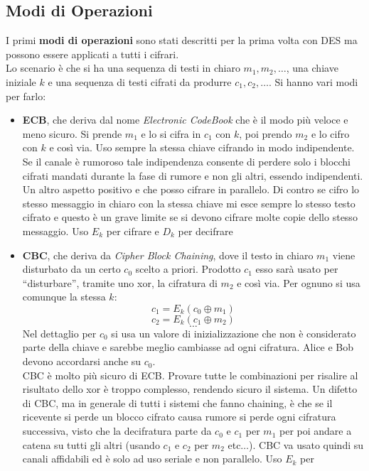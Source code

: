 \documentclass[a4paper,12pt, oneside]{book}
\begin{document}
\subsection{Modi di Operazioni}
I primi \textbf{modi di operazioni} sono stati descritti per la prima volta con
DES ma possono essere applicati a tutti i cifrari.\\
Lo scenario è che si ha una
sequenza di testi in chiaro $m_1,m_2,\ldots$, una chiave iniziale $k$ e una
sequenza di testi cifrati da produrre $c_1,c_2,\ldots$. Si hanno vari modi per
farlo:
\begin{itemize}
  \item \textbf{ECB}, che deriva dal nome \textit{Electronic CodeBook} che è il
  modo più veloce e meno sicuro. Si prende $m_1$ e lo si cifra in $c_1$ con $k$,
  poi prendo $m_2$ e lo cifro con $k$ e così via. Uso sempre la stessa chiave
  cifrando in modo indipendente. Se il canale è rumoroso tale indipendenza
  consente di perdere solo i blocchi cifrati mandati durante la fase di rumore e
  non gli altri, essendo indipendenti. Un altro aspetto positivo e che posso
  cifrare in parallelo. Di contro se cifro lo stesso messaggio in chiaro con la
  stessa chiave mi esce sempre lo stesso testo cifrato e questo è un grave
  limite se si devono cifrare molte copie dello stesso messaggio. Uso $E_k$ per
  cifrare e $D_k$ per decifrare
  \item \textbf{CBC}, che deriva da \textit{Cipher Block Chaining}, dove il
  testo in chiaro 
  $m_1$ viene disturbato da un certo $c_0$ scelto a priori. Prodotto $c_1$ esso
  sarà usato per ``disturbare'', tramite uno xor, la cifratura di $m_2$ e così
  via. Per ognuno si usa 
  comunque la stessa $k$:
  \[c_1=E_k(c_0\oplus m_1)\]
  \[c_2=E_k(c_1\oplus m_2)\]
  \[\ldots\]
  Nel dettaglio per $c_0$ si usa un valore di inizializzazione che non è
  considerato parte della chiave e sarebbe meglio cambiasse ad ogni
  cifratura. Alice e Bob devono accordarsi anche su $c_0$. \\
  CBC è molto più sicuro di ECB. Provare tutte le combinazioni per risalire al
  risultato dello xor è troppo complesso, rendendo sicuro il sistema. Un difetto
  di CBC, ma in generale di tutti i sistemi che fanno chaining, è che se il
  ricevente si perde un blocco cifrato causa rumore si perde ogni cifratura
  successiva, visto che la decifratura parte da $c_0$ e $c_1$ per $m_1$ per poi
  andare a catena su tutti gli altri (usando $c_1$ e $c_2$ per $m_2$
  etc$\ldots$). CBC va usato quindi su canali affidabili ed è solo ad uso
  seriale e non parallelo. Uso $E_k$ per

\end{itemize}
\end{document}
